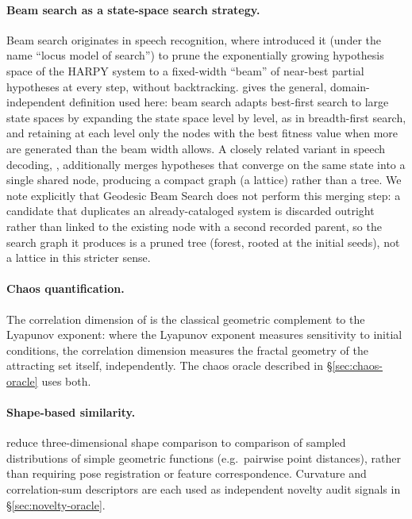 \documentclass[11pt]{article}
\begin{document}
\paragraph{Beam search as a state-space search strategy.}
Beam search originates in speech recognition, where \citet{lowerre1976harpy}
introduced it (under the name ``locus model of search'') to prune the
exponentially growing hypothesis space of the HARPY system to a fixed-width
``beam'' of near-best partial hypotheses at every step, without backtracking.
\citet{bisiani1987beam} gives the general, domain-independent definition used
here: beam search adapts best-first search to large state spaces by expanding
the state space level by level, as in breadth-first search, and retaining at
each level only the nodes with the best fitness value when more are generated
than the beam width allows. A closely related variant in speech decoding,
\citet{ortmanns1997wordgraph}, additionally merges hypotheses that
converge on the same state into a single shared node, producing a compact
graph (a lattice) rather than a tree. We note explicitly that Geodesic
Beam Search does not perform this merging step: a candidate that duplicates
an already-cataloged system is discarded outright rather than linked to the
existing node with a second recorded parent, so the search graph it produces
is a pruned tree (forest, rooted at the initial seeds), not a lattice in this
stricter sense.

\paragraph{Chaos quantification.}
The correlation dimension of \citet{grassberger1983measuring} is the
classical geometric complement to the Lyapunov exponent: where the Lyapunov
exponent measures sensitivity to initial conditions, the correlation
dimension measures the fractal geometry of the attracting set itself,
independently. The chaos oracle described in \S\ref{sec:chaos-oracle} uses
both.

\paragraph{Shape-based similarity.} \citet{osada2002shape} reduce
three-dimensional shape comparison to comparison of sampled distributions of
simple geometric functions (e.g.\ pairwise point distances), rather than
requiring pose registration or feature correspondence. Curvature and
correlation-sum descriptors are each used as independent novelty audit
signals in \S\ref{sec:novelty-oracle}.
\end{document}
